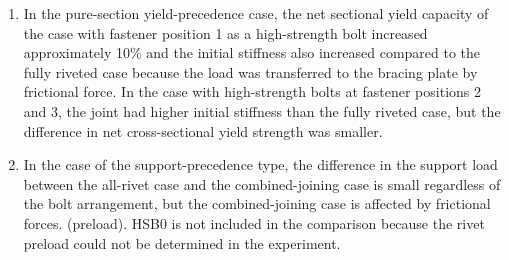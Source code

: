 \begin{enumerate}
    \item  In the pure-section yield-precedence case, the net sectional yield capacity of the case with fastener position 1 as a high-strength bolt increased approximately 10\% and the initial stiffness also increased compared to the fully riveted case because the load was transferred to the bracing plate by frictional force. In the case with high-strength bolts at fastener positions 2 and 3, the joint had higher initial stiffness than the fully riveted case, but the difference in net cross-sectional yield strength was smaller.

    \item In the case of the support-precedence type, the difference in the support load between the all-rivet case and the combined-joining case is small regardless of the bolt arrangement, but the combined-joining case is affected by frictional forces. (preload). HSB0 is not included in the comparison because the rivet preload could not be determined in the experiment.
    
\end{enumerate}
 





